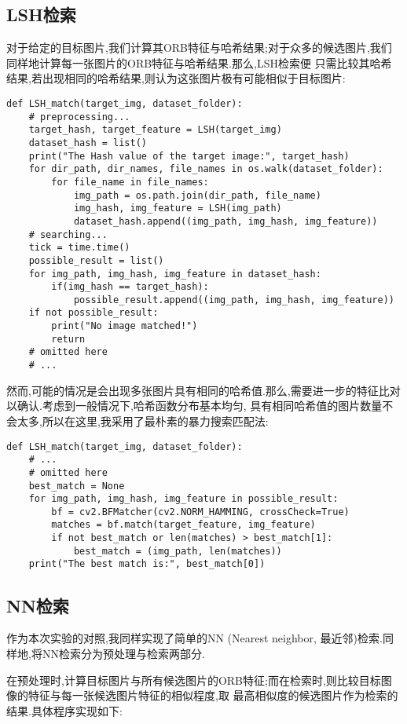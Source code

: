 \documentclass[a4paper]{article}
\begin{document}
    \subsection{LSH检索}
对于给定的目标图片,我们计算其ORB特征与哈希结果;对于众多的候选图片,我们同样地计算每一张图片的ORB特征与哈希结果.那么,LSH检索便
只需比较其哈希结果,若出现相同的哈希结果,则认为这张图片极有可能相似于目标图片:
\begin{verbatim}
def LSH_match(target_img, dataset_folder):
    # preprocessing...
    target_hash, target_feature = LSH(target_img)
    dataset_hash = list()
    print("The Hash value of the target image:", target_hash)
    for dir_path, dir_names, file_names in os.walk(dataset_folder):
        for file_name in file_names:
            img_path = os.path.join(dir_path, file_name)
            img_hash, img_feature = LSH(img_path)
            dataset_hash.append((img_path, img_hash, img_feature))
    # searching...
    tick = time.time()
    possible_result = list()
    for img_path, img_hash, img_feature in dataset_hash:
        if(img_hash == target_hash):
            possible_result.append((img_path, img_hash, img_feature))
    if not possible_result:
        print("No image matched!")
        return
    # omitted here
    # ...
\end{verbatim}

然而,可能的情况是会出现多张图片具有相同的哈希值.那么,需要进一步的特征比对以确认.考虑到一般情况下,哈希函数分布基本均匀,
具有相同哈希值的图片数量不会太多,所以在这里,我采用了最朴素的暴力搜索匹配法:
\begin{verbatim}
def LSH_match(target_img, dataset_folder):
    # ...
    # omitted here
    best_match = None
    for img_path, img_hash, img_feature in possible_result:
        bf = cv2.BFMatcher(cv2.NORM_HAMMING, crossCheck=True)
        matches = bf.match(target_feature, img_feature)
        if not best_match or len(matches) > best_match[1]:
            best_match = (img_path, len(matches))
    print("The best match is:", best_match[0])
\end{verbatim}

        \subsection{NN检索}
作为本次实验的对照,我同样实现了简单的NN (Nearest neighbor, 最近邻)检索.同样地,将NN检索分为预处理与检索两部分.

在预处理时,计算目标图片与所有候选图片的ORB特征;而在检索时,则比较目标图像的特征与每一张候选图片特征的相似程度,取
最高相似度的候选图片作为检索的结果.具体程序实现如下:
\end{document}
